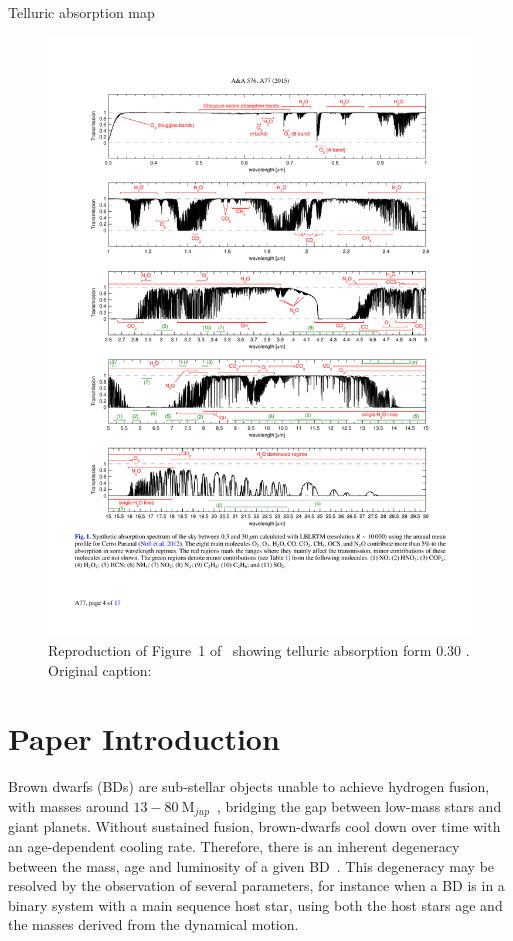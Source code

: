 Telluric absorption map
\begin{figure}
    \centering
    \includegraphics[width=0.9\linewidth]{figures/advanced_material/cropped_molecfit_absorbtion}
    \caption{Reproduction of Figure~1 of~\citet{smette_molecfit_2015} showing telluric absorption form 0.30 \um. Original caption:}
    \label{fig:croppedmolecfitabsorbtion}
\end{figure}




\section{Paper Introduction}\label{sec:intro}
Brown dwarfs (BDs) are sub-stellar objects unable to achieve hydrogen fusion, with masses around \(13-80~\textrm{M}_{jup} \)~\citep{chabrier_theory_2000}, bridging the gap between low-mass stars and giant planets.
Without sustained fusion, brown-dwarfs cool down over time with an age-dependent cooling rate.
Therefore, there is an inherent degeneracy between the mass, age and luminosity of a given BD~\citep{burrows_nongray_1997}.
This degeneracy may be resolved by the observation of several parameters, for instance when a BD is in a binary system with a main sequence host star, using both the host stars age and the masses derived from the dynamical motion.

